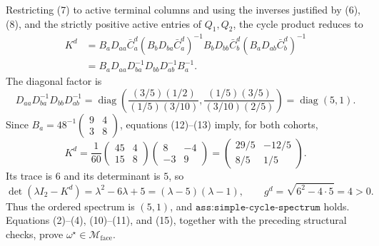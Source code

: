 Restricting (7) to active terminal columns and using the inverses justified by (6), (8), and the strictly positive active entries of \(Q_1,Q_2\), the cycle product reduces to
\[
\begin{aligned}
K^d
&=B_aD_{aa}\bar C_a^d(B_bD_{ba}\bar C_a^d)^{-1}
B_bD_{bb}\bar C_b^d(B_aD_{ab}\bar C_b^d)^{-1}\\
&=B_aD_{aa}D_{ba}^{-1}D_{bb}D_{ab}^{-1}B_a^{-1}.
\end{aligned}                                                \tag{12}
\]
The diagonal factor is
\[
D_{aa}D_{ba}^{-1}D_{bb}D_{ab}^{-1}
=\operatorname{diag}\!\left(
\frac{(3/5)(1/2)}{(1/5)(3/10)},
\frac{(1/5)(3/5)}{(3/10)(2/5)}\right)
=\operatorname{diag}(5,1).                                  \tag{13}
\]
Since \(B_a=48^{-1}\left(\begin{smallmatrix}9&4\\3&8\end{smallmatrix}\right)\), equations (12)--(13) imply, for both cohorts,
\[
K^d=\frac1{60}
\begin{pmatrix}45&4\\15&8\end{pmatrix}
\begin{pmatrix}8&-4\\-3&9\end{pmatrix}
=\begin{pmatrix}29/5&-12/5\\8/5&1/5\end{pmatrix}.          \tag{14}
\]
Its trace is \(6\) and its determinant is \(5\), so
\[
\det(\lambda I_2-K^d)=\lambda^2-6\lambda+5
=(\lambda-5)(\lambda-1),
\qquad
g^d=\sqrt{6^2-4\cdot5}=4>0.                                \tag{15}
\]
Thus the ordered spectrum is \((5,1)\), and \(\texttt{ass:simple-cycle-spectrum}\) holds.  Equations (2)--(4), (10)--(11), and (15), together with the preceding structural checks, prove \(\omega^\star\in\mathcal M_{\mathrm{face}}\).

